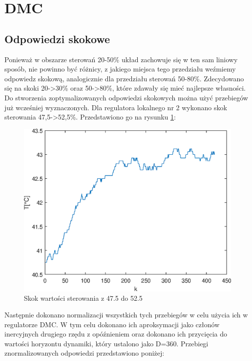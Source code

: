 \section{DMC}

\subsection {Odpowiedzi skokowe}

Ponieważ w obszarze sterowań 20-50\% układ zachowuje się w ten sam liniowy sposób, nie powinno być różnicy, z jakiego miejsca tego przedziału weźmiemy odpowiedz skokową, analogicznie dla przedziału sterowań 50-80\%. Zdecydowano się na skoki 20->30\% oraz 50->80\%, które zdawały się mieć najlepsze własności. Do stworzenia zoptymalizowanych odpowiedzi skokowych można użyć przebiegów już wcześniej wyznaczonych. Dla regulatora lokalnego nr 2 wykonano skok sterowania 47,5->52,5\%. Przedstawiono go na rysunku \ref{skokcen}:

\begin{figure}[h!]
	\centering
	\includegraphics[scale=1]{Rys/Skokcen.eps}
	\caption{Skok wartości sterowania z \num{47,5} do \num{52,5}}
	\label{skokcen}
\end{figure}

\FloatBarrier

Następnie dokonano normalizacji wszystkich tych przebiegów w celu użycia ich w regulatorze DMC. W tym celu dokonano ich aproksymacji jako członów inercyjnych drugiego rzędu z opóźnieniem oraz dokonano ich przycięcia do wartości horyzontu dynamiki, który ustalono jako D=360. Przebiegi znormalizowanych odpowiedzi przedstawiono poniżej:


